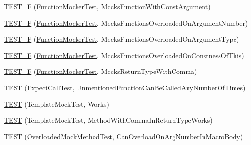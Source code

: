 \begin{DoxyCompactItemize}
\item 
\mbox{\hyperlink{namespacetesting_1_1gmock__generated__function__mockers__test_a957ee1afed65097f1c25790f266ec91e}{T\+E\+S\+T\+\_\+F}} (\mbox{\hyperlink{classtesting_1_1gmock__generated__function__mockers__test_1_1FunctionMockerTest}{Function\+Mocker\+Test}}, Mocks\+Function\+With\+Const\+Argument)
\item 
\mbox{\hyperlink{namespacetesting_1_1gmock__generated__function__mockers__test_a23b4f6d7bf9f6b35126ee137aa48ae3b}{T\+E\+S\+T\+\_\+F}} (\mbox{\hyperlink{classtesting_1_1gmock__generated__function__mockers__test_1_1FunctionMockerTest}{Function\+Mocker\+Test}}, Mocks\+Functions\+Overloaded\+On\+Argument\+Number)
\item 
\mbox{\hyperlink{namespacetesting_1_1gmock__generated__function__mockers__test_a6fb9a5901e2d2066a9fe5a3d05c0cbe1}{T\+E\+S\+T\+\_\+F}} (\mbox{\hyperlink{classtesting_1_1gmock__generated__function__mockers__test_1_1FunctionMockerTest}{Function\+Mocker\+Test}}, Mocks\+Functions\+Overloaded\+On\+Argument\+Type)
\item 
\mbox{\hyperlink{namespacetesting_1_1gmock__generated__function__mockers__test_ad580a4b2f97b3c2643794a627b347511}{T\+E\+S\+T\+\_\+F}} (\mbox{\hyperlink{classtesting_1_1gmock__generated__function__mockers__test_1_1FunctionMockerTest}{Function\+Mocker\+Test}}, Mocks\+Functions\+Overloaded\+On\+Constness\+Of\+This)
\item 
\mbox{\hyperlink{namespacetesting_1_1gmock__generated__function__mockers__test_abb74ac8e211661c0d87c902f87002e6d}{T\+E\+S\+T\+\_\+F}} (\mbox{\hyperlink{classtesting_1_1gmock__generated__function__mockers__test_1_1FunctionMockerTest}{Function\+Mocker\+Test}}, Mocks\+Return\+Type\+With\+Comma)
\item 
\mbox{\hyperlink{namespacetesting_1_1gmock__generated__function__mockers__test_ae0d5aa8e715f3c183f1ccdcf390187e7}{T\+E\+ST}} (Expect\+Call\+Test, Unmentioned\+Function\+Can\+Be\+Called\+Any\+Number\+Of\+Times)
\item 
\mbox{\hyperlink{namespacetesting_1_1gmock__generated__function__mockers__test_a5f59a7b507101fc0dbb558c090974f02}{T\+E\+ST}} (Template\+Mock\+Test, Works)
\item 
\mbox{\hyperlink{namespacetesting_1_1gmock__generated__function__mockers__test_aa998c7e5e8b6fd378cacb53663e8c4a6}{T\+E\+ST}} (Template\+Mock\+Test, Method\+With\+Comma\+In\+Return\+Type\+Works)
\item 
\mbox{\hyperlink{namespacetesting_1_1gmock__generated__function__mockers__test_a6542d3ae3f153907c32f3cf15a2ff6cf}{T\+E\+ST}} (Overloaded\+Mock\+Method\+Test, Can\+Overload\+On\+Arg\+Number\+In\+Macro\+Body)

\end{DoxyCompactItemize}
